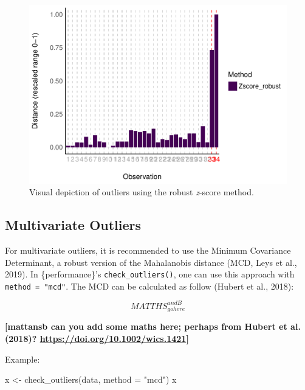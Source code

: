 \documentclass[
]{article}
\newenvironment{Shaded}{\begin{snugshade}}{\end{snugshade}}
\newcommand{\AttributeTok}[1]{\textcolor[rgb]{0.77,0.63,0.00}{#1}}
\newcommand{\FunctionTok}[1]{\textcolor[rgb]{0.00,0.00,0.00}{#1}}
\newcommand{\NormalTok}[1]{#1}
\newcommand{\OtherTok}[1]{\textcolor[rgb]{0.56,0.35,0.01}{#1}}
\newcommand{\StringTok}[1]{\textcolor[rgb]{0.31,0.60,0.02}{#1}}
\begin{document}
\begin{figure}
\includegraphics[width=1\linewidth]{paper_files/figure-latex/univariate-1} \caption{Visual depiction of outliers using the robust \emph{z}-score method.}\label{fig:univariate}
\end{figure}

\hypertarget{multivariate-outliers}{%
\subsection{Multivariate Outliers}\label{multivariate-outliers}}

For multivariate outliers, it is recommended to use the Minimum Covariance Determinant, a robust version of the Mahalanobis distance (MCD, Leys et al., 2019). In \{performance\}'s \texttt{check\_outliers()}, one can use this approach with \texttt{method\ =\ "mcd"}. The MCD can be calculated as follow (Hubert et al., 2018):

\[
MATTHS_{gohere}^{andB}
\]

\textbf{{[}mattansb can you add some maths here; perhaps from Hubert et al. (2018)? \url{https://doi.org/10.1002/wics.1421}{]}}

Example:



\begin{Shaded}
\begin{Highlighting}[]
\NormalTok{x }\OtherTok{\textless{}{-}} \FunctionTok{check\_outliers}\NormalTok{(data, }\AttributeTok{method =} \StringTok{"mcd"}\NormalTok{)}
\NormalTok{x}
\end{Highlighting}
\end{Shaded}
\end{document}
